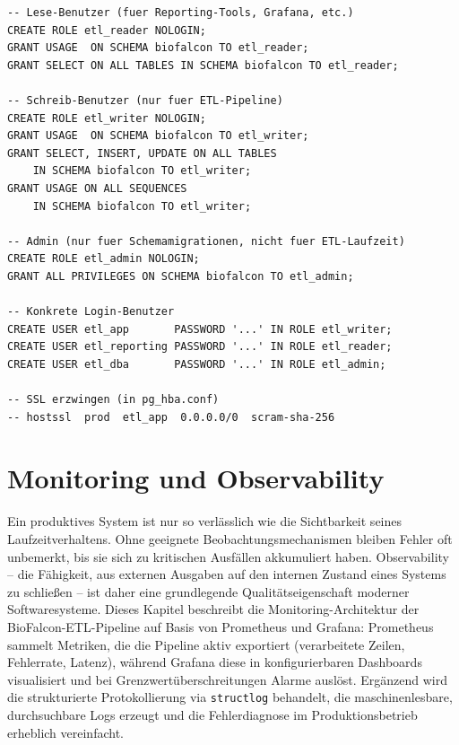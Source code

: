 ﻿\documentclass[12pt,a4paper]{report}
\theoremstyle{definition}
\theoremstyle{remark}
\newcommand{\code}[1]{\texttt{#1}}
\begin{document}
\begin{lstlisting}[style=sql, caption={SQL: Benutzerverwaltung nach Least-Privilege-Prinzip}]
-- Lese-Benutzer (fuer Reporting-Tools, Grafana, etc.)
CREATE ROLE etl_reader NOLOGIN;
GRANT USAGE  ON SCHEMA biofalcon TO etl_reader;
GRANT SELECT ON ALL TABLES IN SCHEMA biofalcon TO etl_reader;

-- Schreib-Benutzer (nur fuer ETL-Pipeline)
CREATE ROLE etl_writer NOLOGIN;
GRANT USAGE  ON SCHEMA biofalcon TO etl_writer;
GRANT SELECT, INSERT, UPDATE ON ALL TABLES
    IN SCHEMA biofalcon TO etl_writer;
GRANT USAGE ON ALL SEQUENCES
    IN SCHEMA biofalcon TO etl_writer;

-- Admin (nur fuer Schemamigrationen, nicht fuer ETL-Laufzeit)
CREATE ROLE etl_admin NOLOGIN;
GRANT ALL PRIVILEGES ON SCHEMA biofalcon TO etl_admin;

-- Konkrete Login-Benutzer
CREATE USER etl_app       PASSWORD '...' IN ROLE etl_writer;
CREATE USER etl_reporting PASSWORD '...' IN ROLE etl_reader;
CREATE USER etl_dba       PASSWORD '...' IN ROLE etl_admin;

-- SSL erzwingen (in pg_hba.conf)
-- hostssl  prod  etl_app  0.0.0.0/0  scram-sha-256
\end{lstlisting}

\chapter{Monitoring und Observability}
\label{sec:monitoring}

Ein produktives System ist nur so verlässlich wie die Sichtbarkeit seines Laufzeitverhaltens. Ohne geeignete Beobachtungsmechanismen bleiben Fehler oft unbemerkt, bis sie sich zu kritischen Ausfällen akkumuliert haben. Observability -- die Fähigkeit, aus externen Ausgaben auf den internen Zustand eines Systems zu schließen -- ist daher eine grundlegende Qualitätseigenschaft moderner Softwaresysteme. Dieses Kapitel beschreibt die Monitoring-Architektur der BioFalcon-ETL-Pipeline auf Basis von Prometheus und Grafana: Prometheus sammelt Metriken, die die Pipeline aktiv exportiert (verarbeitete Zeilen, Fehlerrate, Latenz), während Grafana diese in konfigurierbaren Dashboards visualisiert und bei Grenzwertüberschreitungen Alarme auslöst. Ergänzend wird die strukturierte Protokollierung via \code{structlog} behandelt, die maschinenlesbare, durchsuchbare Logs erzeugt und die Fehlerdiagnose im Produktionsbetrieb erheblich vereinfacht.
\end{document}
